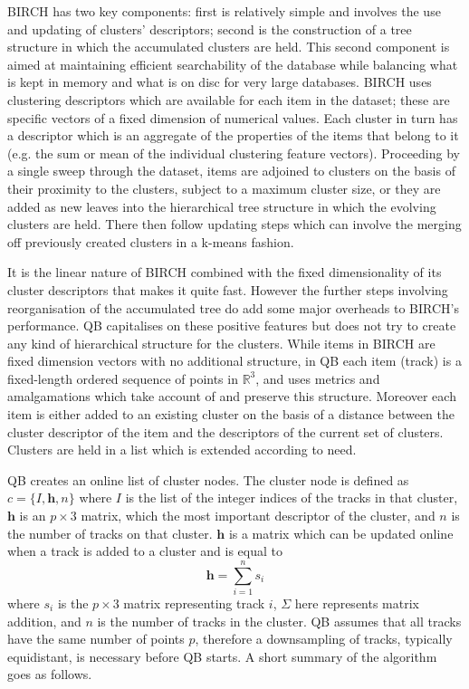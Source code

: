 \documentclass[preprint,authoryear,a4paper,10pt,onecolumn]{elsarticle}
\begin{document}
BIRCH has two key components: first is relatively simple and involves
the use and updating of clusters' descriptors; second is the
construction of a tree structure in which the accumulated clusters are
held. This second component is aimed at maintaining efficient
searchability of the database while balancing what is kept in memory and
what is on disc for very large databases. BIRCH uses clustering
descriptors which are available for each item in the dataset; these are
specific vectors of a fixed dimension of numerical values. Each cluster
in turn has a descriptor which is an aggregate of the properties of the
items that belong to it (e.g. the sum or mean of the individual
clustering feature vectors). Proceeding by a single sweep through the
dataset, items are adjoined to clusters on the basis of their proximity
to the clusters, subject to a maximum cluster size, or they are added as
new leaves into the hierarchical tree structure in which the evolving
clusters are held. There then follow updating steps which can involve
the merging off previously created clusters in a k-means
fashion\cite{steinhaus1956division,macqueen1967some}.

It is the linear nature of BIRCH combined with the fixed dimensionality
of its cluster descriptors that makes it quite fast. However the further
steps involving reorganisation of the accumulated tree do add some major
overheads to BIRCH's performance. QB capitalises on these positive
features but does not try to create any kind of hierarchical structure
for the clusters. While items in BIRCH are fixed dimension vectors with
no additional structure, in QB each item (track) is a fixed-length
ordered sequence of points in $\mathbb{R}^{3}$, and uses metrics and
amalgamations which take account of and preserve this structure.
Moreover each item is either added to an existing cluster on the basis
of a distance between the cluster descriptor of the item and the
descriptors of the current set of clusters. Clusters are held in a list
which is extended according to need.

QB creates an online list of cluster nodes. The cluster node is defined
as $c=\{I,\mathbf{h},n\}$ where $I$ is the list of the integer indices
of the tracks in that cluster, $\mathbf{h}$ is an $p\times3$ matrix,
which the most important descriptor of the cluster, and $n$ is the
number of tracks on that cluster. $\mathbf{h}$ is a matrix which
can be updated online when a track is added to a cluster and is equal
to\begin{equation}
\mathbf{h}=\sum_{i=1}^{n}s_{i}\end{equation}
where $s_{i}$ is the $p\times3$ matrix representing track $i$,
$\Sigma$ here represents matrix addition, and $n$ is the number
of tracks in the cluster. QB assumes that all tracks have the same
number of points $p$, therefore a downsampling of tracks, typically
equidistant, is necessary before QB starts. A short summary of the
algorithm goes as follows. 
\end{document}
